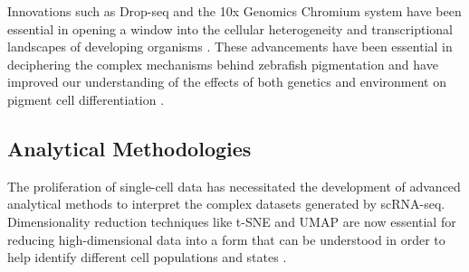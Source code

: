 \documentclass[runningheads]{llncs}
\begin{document}
Innovations such as Drop-seq and the 10x Genomics Chromium system have been essential in opening a window into the cellular heterogeneity and transcriptional landscapes of developing organisms \cite{nayak2021hitchhiker}. These advancements have been essential in deciphering the complex mechanisms behind zebrafish pigmentation and have improved our understanding of the effects of both genetics and environment on pigment cell differentiation \cite{qiu2017reversed}.

\subsection{Analytical Methodologies}
The proliferation of single-cell data has necessitated the development of advanced analytical methods to interpret the complex datasets generated by scRNA-seq. Dimensionality reduction techniques like t-SNE and UMAP are now essential for reducing high-dimensional data into a form that can be understood in order to help identify different cell populations and states \cite{kulkarni2019beyond,nayak2021hitchhiker}.
\end{document}
